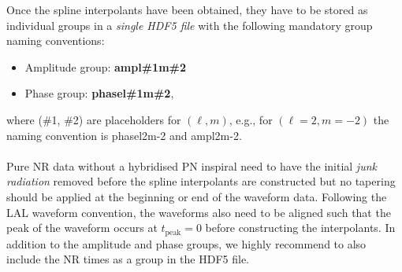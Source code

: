 \documentclass[aps,prd,amssymb,amsmath,amsfonts,superscriptaddress,
floatfix ,preprintnumbers,altaffilletter]{revtex4}
\begin{document}
Once the spline interpolants have been obtained, they have to be stored as individual groups in a \emph{single HDF5 file} with the following mandatory group naming conventions: 
\begin{itemize}
  \item Amplitude group: \textbf{amp\textunderscore l\#1\textunderscore m\#2}
  \item Phase group: \textbf{phase\textunderscore  l\#1\textunderscore m\#2},
\end{itemize}
where (\#1, \#2) are placeholders for $(\ell, m)$, e.g., for $(\ell=2, m=-2)$ the naming convention is phase\textunderscore l2\textunderscore m-2 and 
amp\textunderscore l2\textunderscore m-2. \\
\\Pure NR data without a hybridised PN inspiral need to have the initial \emph{junk radiation} removed before the spline interpolants are constructed but no tapering should be applied at the beginning or end of the waveform data. Following the LAL waveform convention, the waveforms also need to be aligned such that the peak of the waveform occurs at $t_\mathrm{peak}=0$ before constructing the interpolants. In addition to the amplitude and phase groups, we highly recommend to also include the NR times as a group in the HDF5 file. 

\end{document}
